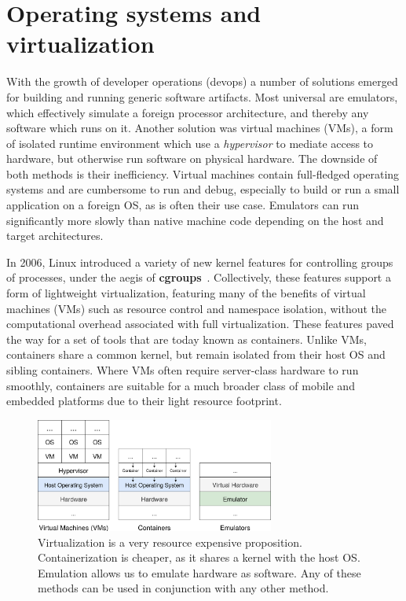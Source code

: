 \documentclass[12pt,initial,twoside,maitrise]{dms}
\numberwithin{equation}{section}
\numberwithin{table}{chapter}
\numberwithin{figure}{chapter}
\begin{document}
\section{Operating systems and virtualization}\label{sec:os-and-virtualization}

With the growth of developer operations (devops) a number of solutions emerged for building and running generic software artifacts. Most universal are emulators, which effectively simulate a foreign processor architecture, and thereby any software which runs on it. Another solution was virtual machines (VMs), a form of isolated runtime environment which use a \textit{hypervisor} to mediate access to hardware, but otherwise run software on physical hardware. The downside of both methods is their inefficiency. Virtual machines contain full-fledged operating systems and are cumbersome to run and debug, especially to build or run a small application on a foreign OS, as is often their use case. Emulators can run significantly more slowly than native machine code depending on the host and target architectures.

In 2006, Linux introduced a variety of new kernel features for controlling groups of processes, under the aegis of \textbf{cgroups}~\citep{menage2007adding}. Collectively, these features support a form of lightweight virtualization, featuring many of the benefits of virtual machines (VMs) such as resource control and namespace isolation, without the computational overhead associated with full virtualization. These features paved the way for a set of tools that are today known as containers. Unlike VMs, containers share a common kernel, but remain isolated from their host OS and sibling containers. Where VMs often require server-class hardware to run smoothly, containers are suitable for a much broader class of mobile and embedded platforms due to their light resource footprint.

\begin{figure}
    \centering
    \includegraphics[width=0.70\textwidth]{vms_containers_emulators.png}
    \caption{Virtualization is a very resource expensive proposition. Containerization is cheaper, as it shares a kernel with the host OS. Emulation allows us to emulate hardware as software. Any of these methods can be used in conjunction with any other method.\vspace{-10pt}}
    \label{fig:vms_containers_emulators}
\end{figure}
\end{document}
